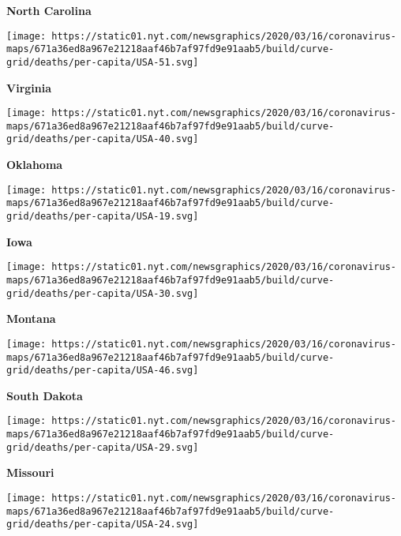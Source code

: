 \textbf{North Carolina}

\href{https://www.nytimes.com/interactive/2020/us/virginia-coronavirus-cases.html}{}

\texttt{[image: https://static01.nyt.com/newsgraphics/2020/03/16/coronavirus-maps/671a36ed8a967e21218aaf46b7af97fd9e91aab5/build/curve-grid/deaths/per-capita/USA-51.svg]}

\textbf{Virginia}

\href{https://www.nytimes.com/interactive/2020/us/oklahoma-coronavirus-cases.html}{}

\texttt{[image: https://static01.nyt.com/newsgraphics/2020/03/16/coronavirus-maps/671a36ed8a967e21218aaf46b7af97fd9e91aab5/build/curve-grid/deaths/per-capita/USA-40.svg]}

\textbf{Oklahoma}

\href{https://www.nytimes.com/interactive/2020/us/iowa-coronavirus-cases.html}{}

\texttt{[image: https://static01.nyt.com/newsgraphics/2020/03/16/coronavirus-maps/671a36ed8a967e21218aaf46b7af97fd9e91aab5/build/curve-grid/deaths/per-capita/USA-19.svg]}

\textbf{Iowa}

\href{https://www.nytimes.com/interactive/2020/us/montana-coronavirus-cases.html}{}

\texttt{[image: https://static01.nyt.com/newsgraphics/2020/03/16/coronavirus-maps/671a36ed8a967e21218aaf46b7af97fd9e91aab5/build/curve-grid/deaths/per-capita/USA-30.svg]}

\textbf{Montana}

\href{https://www.nytimes.com/interactive/2020/us/south-dakota-coronavirus-cases.html}{}

\texttt{[image: https://static01.nyt.com/newsgraphics/2020/03/16/coronavirus-maps/671a36ed8a967e21218aaf46b7af97fd9e91aab5/build/curve-grid/deaths/per-capita/USA-46.svg]}

\textbf{South Dakota}

\href{https://www.nytimes.com/interactive/2020/us/missouri-coronavirus-cases.html}{}

\texttt{[image: https://static01.nyt.com/newsgraphics/2020/03/16/coronavirus-maps/671a36ed8a967e21218aaf46b7af97fd9e91aab5/build/curve-grid/deaths/per-capita/USA-29.svg]}

\textbf{Missouri}

\href{https://www.nytimes.com/interactive/2020/us/maryland-coronavirus-cases.html}{}

\texttt{[image: https://static01.nyt.com/newsgraphics/2020/03/16/coronavirus-maps/671a36ed8a967e21218aaf46b7af97fd9e91aab5/build/curve-grid/deaths/per-capita/USA-24.svg]}

